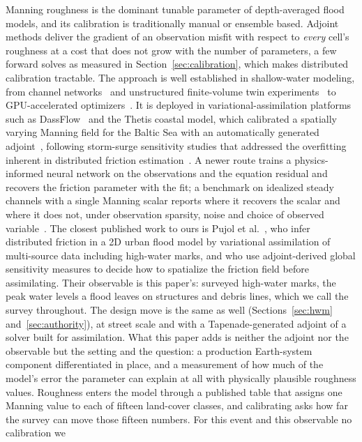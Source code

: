 \documentclass[11pt]{article}
\begin{document}
Manning roughness is the dominant tunable parameter of depth-averaged
flood models, and its calibration is traditionally manual or ensemble
based. Adjoint methods deliver the gradient of an observation misfit
with respect to \emph{every} cell's roughness at a cost that does not
grow with the number of parameters, a few forward solves as measured
in Section~\ref{sec:calibration}, which makes distributed calibration
tractable. The approach is well established in shallow-water
modeling, from channel networks~\cite{ding2004manning} and
unstructured finite-volume twin experiments~\cite{yan2014adjoint} to
GPU-accelerated optimizers~\cite{lacasta2016gpu}. It is deployed in
variational-assimilation platforms such as
DassFlow~\cite{dassflow,lai2009assimilation,brisset2018swot} and the
Thetis coastal model, which calibrated a spatially varying Manning
field for the Baltic Sea with an automatically generated
adjoint~\cite{karna2023baltic}, following storm-surge sensitivity
studies that addressed the overfitting inherent in distributed
friction estimation~\cite{warder2021storm}. A newer route trains a
physics-informed neural network on the observations and the equation
residual and recovers the friction parameter with the fit; a benchmark
on idealized steady channels with a single Manning scalar reports where
it recovers the scalar and where it does not, under observation
sparsity, noise and choice of observed
variable~\cite{radfar2026pinn}. The closest published
work to ours is Pujol et al.~\cite{pujol2024urban}, who infer
distributed friction in a 2D urban flood model by variational
assimilation of multi-source data including high-water marks, and who
use adjoint-derived global sensitivity measures to decide how to
spatialize the friction field before assimilating. Their observable is
this paper's: surveyed high-water marks, the peak water levels a flood
leaves on structures and debris lines, which we call the survey
throughout. The design move is the same as well
(Sections~\ref{sec:hwm} and~\ref{sec:authority}), at street scale and
with a Tapenade-generated adjoint of a solver built for assimilation. What
this paper adds is neither the adjoint nor the observable but the
setting and the question: a production Earth-system component
differentiated in place, and a measurement of how much of the model's
error the parameter can explain at all with physically plausible
roughness values. Roughness enters the model through a published
table that assigns one Manning value to each of fifteen land-cover
classes, and calibrating asks how far the survey can move those
fifteen numbers. For this event and this observable no calibration we
\end{document}
